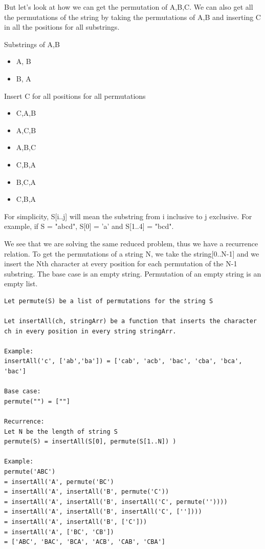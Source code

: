 \documentclass[11pt,oneside]{book}
\begin{document}
But let's look at how we can get the permutation of A,B,C. We can also get all the permutations of the string by taking the permutations of A,B and inserting C in all the positions for all substrings.

Substrings of A,B

\begin{itemize}
\item A, B
\item B, A
\end{itemize}

Insert C for all positions for all permutations

\begin{itemize}
\item C,A,B
\item A,C,B
\item A,B,C
\item C,B,A
\item B,C,A
\item C,B,A
\end{itemize}

For simplicity, S[i..j] will mean the substring from i inclusive to j exclusive. For example, if S = "abcd", S[0] = 'a' and S[1..4] = "bcd".

We see that we are solving the same reduced problem, thus we have a recurrence relation. To get the permutations of a string N, we take the string[0..N-1] and we insert the Nth character at every position for each permutation of the N-1 substring. The base case is an empty string. Permutation of an empty string is an empty list.

\begin{lstlisting}
Let permute(S) be a list of permutations for the string S

Let insertAll(ch, stringArr) be a function that inserts the character ch in every position in every string stringArr.

Example: 
insertAll('c', ['ab','ba']) = ['cab', 'acb', 'bac', 'cba', 'bca', 'bac'] 

Base case:
permute("") = [""]

Recurrence:
Let N be the length of string S
permute(S) = insertAll(S[0], permute(S[1..N]) )

Example:
permute('ABC')
= insertAll('A', permute('BC')
= insertAll('A', insertAll('B', permute('C'))
= insertAll('A', insertAll('B', insertAll('C', permute(''))))
= insertAll('A', insertAll('B', insertAll('C', [''])))
= insertAll('A', insertAll('B', ['C']))
= insertAll('A', ['BC', 'CB'])
= ['ABC', 'BAC', 'BCA', 'ACB', 'CAB', 'CBA']
\end{lstlisting}
\end{document}
